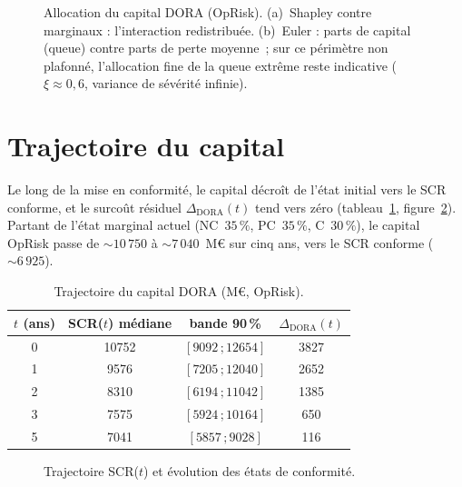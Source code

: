\begin{figure}[htbp]\centering
{}
\caption{Allocation du capital DORA (OpRisk). (a)~Shapley contre marginaux : l'interaction
redistribuée. (b)~Euler : parts de capital (queue) contre parts de perte moyenne~; sur ce
périmètre non plafonné, l'allocation fine de la queue extrême reste indicative
($\xi \approx 0{,}6$, variance de sévérité infinie).}
\label{fig:allocation}
\end{figure}

\section{Trajectoire du capital}
\label{sec:res-traj}

Le long de la mise en conformité, le capital décroît de l'état initial vers le SCR conforme, et
le surcoût résiduel $\Delta_{\text{DORA}}(t)$ tend vers zéro (tableau~\ref{tab:traj},
figure~\ref{fig:traj}). Partant de l'état marginal actuel (NC~$35\,\%$, PC~$35\,\%$, C~$30\,\%$),
le capital OpRisk passe de $\sim 10\,750$ à $\sim 7\,040$~M\euro{} sur cinq ans, vers le SCR
conforme ($\sim 6\,925$).

\begin{table}[htbp]\centering\small
\renewcommand{\arraystretch}{1.2}
\begin{tabular}{@{}c ccc@{}}
\toprule
$t$ (ans) & SCR($t$) médiane & bande 90\,\% & $\Delta_{\text{DORA}}(t)$ \\
\midrule
0 & 10752 & $[9092\,;12654]$ & 3827 \\
1 & 9576  & $[7205\,;12040]$ & 2652 \\
2 & 8310  & $[6194\,;11042]$ & 1385 \\
3 & 7575  & $[5924\,;10164]$ & 650 \\
5 & 7041  & $[5857\,;9028]$  & 116 \\
\bottomrule
\end{tabular}
\caption{Trajectoire du capital DORA (M\euro, OpRisk).}
\label{tab:traj}
\end{table}

\begin{figure}[H]\centering
{}
\caption{Trajectoire SCR($t$) et évolution des états de conformité.}
\label{fig:traj}
\end{figure}

